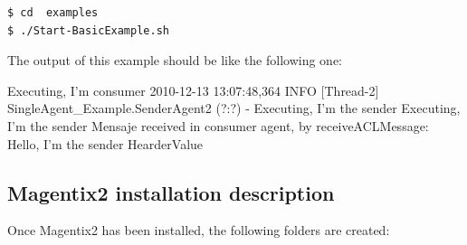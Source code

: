 \begin{verbatim}
$ cd  examples
$ ./Start-BasicExample.sh
\end{verbatim}

The output of this example should be like the following one:

\begin{codigo}
 Executing, I'm consumer
2010-12-13 13:07:48,364 INFO  
[Thread-2] SingleAgent_Example.SenderAgent2 (?:?) - 
        Executing, I'm the sender
Executing, I'm the sender
Mensaje received in consumer agent,
 by receiveACLMessage: Hello, I'm the sender
HearderValue
\end{codigo}



\subsection{Magentix2 installation description}\label{sec:InstallMagentix2DistDirectory}
Once Magentix2 has been installed, the following folders are created:
